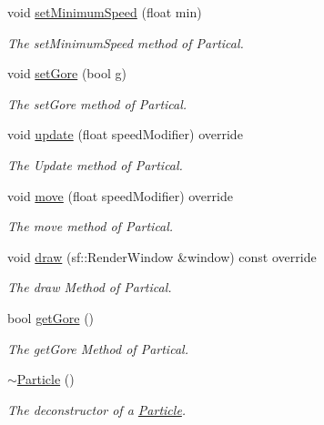 \begin{DoxyCompactItemize}
void \hyperlink{class_particle_aed19fba4d00acaa104bf1030c99b99e9}{set\+Minimum\+Speed} (float min)
\begin{DoxyCompactList}\small\item\em The set\+Minimum\+Speed method of Partical. \end{DoxyCompactList}\item 
void \hyperlink{class_particle_a88d3824351cadeda57b752a6bc14d175}{set\+Gore} (bool g)
\begin{DoxyCompactList}\small\item\em The set\+Gore method of Partical. \end{DoxyCompactList}\item 
void \hyperlink{class_particle_a9bd18a091946b1814f685118dfe66a1e}{update} (float speed\+Modifier) override
\begin{DoxyCompactList}\small\item\em The Update method of Partical. \end{DoxyCompactList}\item 
void \hyperlink{class_particle_a6273669457c67cde70b992a59e589022}{move} (float speed\+Modifier) override
\begin{DoxyCompactList}\small\item\em The move method of Partical. \end{DoxyCompactList}\item 
void \hyperlink{class_particle_afa25f9b8898269ebf36593d7176b3145}{draw} (sf\+::\+Render\+Window \&window) const override
\begin{DoxyCompactList}\small\item\em The draw Method of Partical. \end{DoxyCompactList}\item 
bool \hyperlink{class_particle_a22249cbdfd21c42b65db1ce9936202c9}{get\+Gore} ()
\begin{DoxyCompactList}\small\item\em The get\+Gore Method of Partical. \end{DoxyCompactList}\item 
\hypertarget{class_particle_ad030d0fe7b88cf81744b127c99244ff4}{\hyperlink{class_particle_ad030d0fe7b88cf81744b127c99244ff4}{$\sim$\+Particle} ()}\label{class_particle_ad030d0fe7b88cf81744b127c99244ff4}

\begin{DoxyCompactList}\small\item\em The deconstructor of a \hyperlink{class_particle}{Particle}. \end{DoxyCompactList}\end{DoxyCompactItemize}
